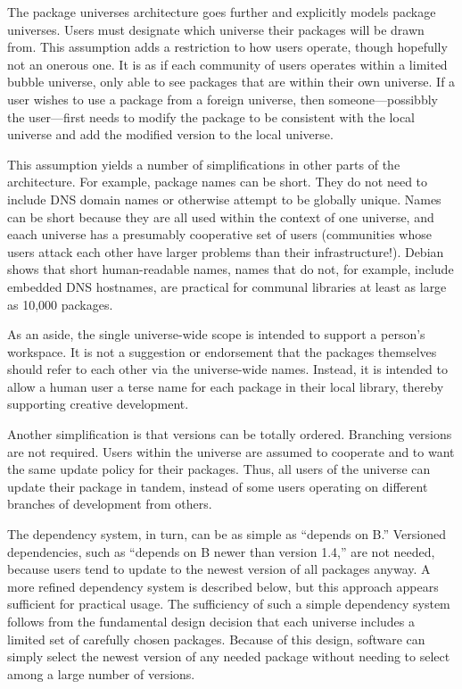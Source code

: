 \documentclass{article}
\begin{document}
The package universes architecture goes further and explicitly models
package universes.  Users must designate which universe their packages
will be drawn from.  This assumption adds a restriction to how users
operate, though hopefully not an onerous one.  It is as if each
community of users operates within a limited bubble universe, only
able to see packages that are within their own universe.  If a user
wishes to use a package from a foreign universe, then
someone---possibbly the user---first needs to modify the package to be
consistent with the local universe and add the modified version to the
local universe.

This assumption yields a number of simplifications in other parts of
the architecture.  For example, package names can be short.  They do
not need to include DNS domain names or otherwise attempt to be
globally unique.
Names can be short because they are all used within the
context of one universe, and eaach universe has a presumably
cooperative set of users (communities whose users attack each other
have larger problems than their infrastructure!).  Debian
shows that short human-readable names, names that do not, for example,
include embedded DNS hostnames, are practical for communal libraries
at least as large as 10,000 packages.

As an aside, the single universe-wide scope is intended to support a
person's workspace.  It is not a suggestion or endorsement that the
packages themselves should refer to each other via the universe-wide
names.  Instead, it is intended to allow a human user a terse name for
each package in their local library, thereby supporting creative
development.


Another simplification is that versions can be totally ordered.
Branching versions are not required.  Users within the universe are
assumed to cooperate and to want the same update policy for their
packages.  Thus, all users of the universe can update their package in
tandem, instead of some users operating on different branches of
development from others.

The dependency system, in turn, can be as simple as ``depends on B.''
Versioned dependencies, such as ``depends on B newer than version
1.4,'' are not needed, because users tend to update to the newest
version of all packages anyway.  A more refined dependency system is
described below, but this approach appears sufficient for practical
usage.  The sufficiency of such a simple dependency system follows
from the fundamental design decision that each universe includes a
limited set of carefully chosen packages.  Because of this design,
software can simply select the newest version of any needed package
without needing to select among a large number of versions.
\end{document}
